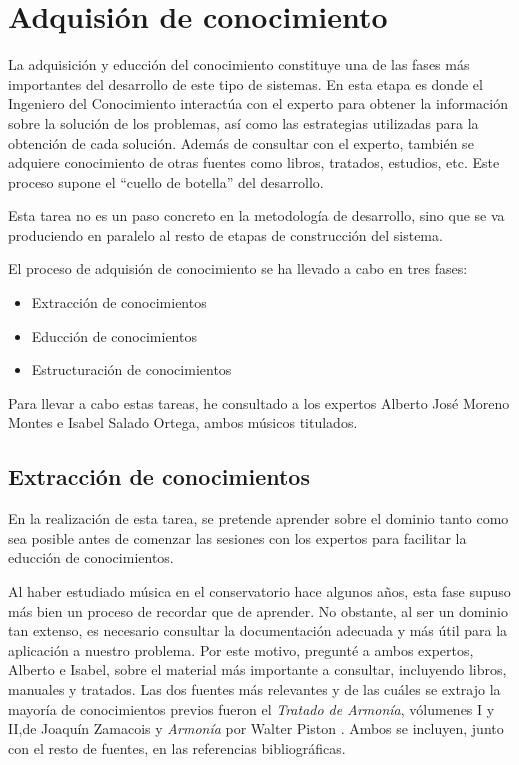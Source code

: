 \chapter{Adquisión de conocimiento}

La adquisición y educción del conocimiento constituye una de las fases más importantes del desarrollo de este tipo de sistemas. En esta etapa es donde el Ingeniero del Conocimiento interactúa con el experto para obtener la información sobre la solución de los problemas, así como las estrategias utilizadas para la obtención de cada solución. Además de consultar con el experto, también se adquiere conocimiento de otras fuentes como libros, tratados, estudios, etc. Este proceso supone el ``cuello de botella'' del desarrollo.
 
Esta tarea no es un paso concreto en la metodología de desarrollo, sino que se va produciendo en paralelo al resto de etapas de construcción del sistema.

El proceso de adquisión de conocimiento se ha llevado a cabo en tres fases: 

\begin{itemize}
	\item Extracción de conocimientos
	\item Educción de conocimientos
	\item Estructuración de conocimientos
\end{itemize}
 
Para llevar a cabo estas tareas, he consultado a los expertos Alberto José Moreno Montes e Isabel Salado Ortega, ambos músicos titulados.  

\section{Extracción de conocimientos}

En la realización de esta tarea, se pretende aprender sobre el dominio tanto como sea posible antes de comenzar las sesiones con los expertos para facilitar la educción de conocimientos. 

Al haber estudiado música en el conservatorio hace algunos años, esta fase supuso más bien un proceso de recordar que de aprender. No obstante, al ser un dominio tan extenso, es necesario consultar la documentación adecuada y más útil para la aplicación a nuestro problema. Por este motivo, pregunté a ambos expertos, Alberto e Isabel, sobre el material más importante a consultar, incluyendo libros, manuales y tratados. Las dos fuentes más relevantes y de las cuáles se extrajo la mayoría de conocimientos previos fueron el \textit{Tratado de Armonía}, vólumenes I y II,de Joaquín Zamacois \cite{ZAMACOIS1, ZAMACOIS2} y \textit{Armonía} por Walter Piston \cite{PISTON}. Ambos se incluyen, junto con el resto de fuentes, en las referencias bibliográficas. 

